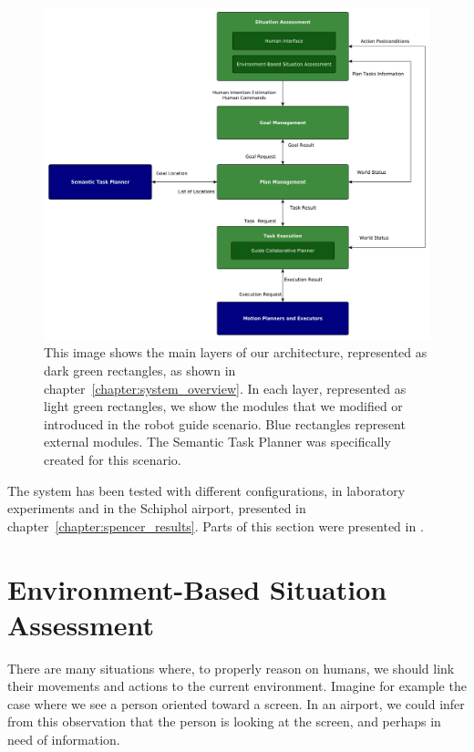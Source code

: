 \begin{figure}[ht!]
	\centering
	\includegraphics[scale=0.38]{img/case_study/spencer/architecture.pdf}
	\caption[Robot guide architecture]{This image shows the main layers of our architecture, represented as dark green rectangles, as shown in chapter~\ref{chapter:system_overview}. In each layer, represented as light green rectangles, we show the modules that we modified or introduced in the robot guide scenario. Blue rectangles represent external modules. The Semantic Task Planner was specifically created for this scenario.}
	\label{fig:spencer-architecture}
\end{figure}

The system has been tested with different configurations, in laboratory experiments and in the Schiphol airport, presented in chapter~\ref{chapter:spencer_results}. Parts of this section were presented in \cite{fiore2015adaptive}.

\section{Environment-Based Situation Assessment}
\label{sec:spencer-intention}
There are many situations where, to properly reason on humans, we should link their movements and actions to the current environment. Imagine for example the case where we see a person oriented toward a screen. In an airport, we could infer from this observation that the person is looking at the screen, and perhaps in need of information. 

